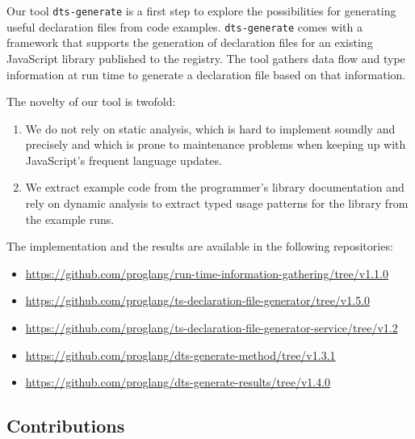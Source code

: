 \documentclass[sigconf]{acmart}
\begin{document}
Our tool \texttt{dts-generate} is a first step to explore the possibilities for
generating useful declaration files from code
examples. \texttt{dts-generate} comes with a framework that 
supports the generation of declaration files for an existing
JavaScript library published to the \NPM{} registry. The tool gathers
data flow and type information at run time to generate a declaration
file based on that information.

The novelty of our tool is twofold:
\begin{enumerate}
\item
  We do not rely on static analysis, which is hard to implement
  soundly and precisely and which is prone to maintenance problems
  when keeping up with JavaScript's frequent language updates.
\item
  We extract example code from the programmer's library
  documentation and rely on dynamic analysis to extract typed usage
  patterns for the library from the example runs.
\end{enumerate}


The implementation and the results are available in the following repositories:

\begin{itemize}
  \item \url{https://github.com/proglang/run-time-information-gathering/tree/v1.1.0}
  \item \url{https://github.com/proglang/ts-declaration-file-generator/tree/v1.5.0}
  \item \url{https://github.com/proglang/ts-declaration-file-generator-service/tree/v1.2}
  \item \url{https://github.com/proglang/dts-generate-method/tree/v1.3.1}
  \item \url{https://github.com/proglang/dts-generate-results/tree/v1.4.0}
\end{itemize}

\subsection{Contributions}
\label{sec:contributions}
\end{document}
